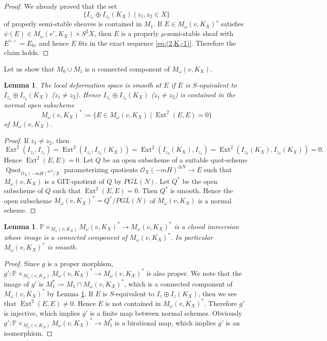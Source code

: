 \documentclass[leqno,11pt]{amsart}
\def\P{\ensuremath{\mathbb{P}}}
\def\Ext{\mathop{\mathrm{Ext}}\nolimits}
\def\Quot{\mathop{\mathrm{Quot}}\nolimits}
\newtheorem{Lem}[Thm]{Lemma}
\theoremstyle{definition}
\def\P{\ensuremath{\mathbb{P}}}
\def\OO{\ensuremath{\mathcal O}}
\begin{document}
\begin{proof}
We already proved that the set  
$$
\{I_{z_1} \oplus I_{z_2}(K_X) \mid z_1,z_2 \in X\}
$$
of properly semi-stable
sheaves is contained in $M_1$.
If $E \in M_\omega(v,K_X)^s$ satisfies
$\psi(E) \in M_\omega(v',K_X) \times S^2 X$, then
$E$ is a properly $\mu$-semi-stable sheaf with 
$E^{\vee \vee}=E_0$, and hence $E$ fits in the exact sequence
\eqref{eq:(2,K,-1)}.
Therefore the claim holds.
\end{proof}


Let us show that $M_0 \cup M_1$ is a connected component of
$M_\omega(v,K_X)$.

 
\begin{Lem}\label{lem:normal}
The local deformation space is smooth at $E$ if
$E$ is $S$-equivalent to $I_{z_1} \oplus I_{z_2} (K_X)$ ($z_1 \ne z_2$).
Hence $I_{z_1} \oplus I_{z_2} (K_X)$ ($z_1 \ne z_2$)
is contained in the normal open subscheme
$$
M_\omega(v,K_X)^*:=\{ E \in M_\omega(v,K_X) \mid \Ext^2(E,E)=0\}
$$
of $M_\omega(v,K_X)$.
\end{Lem}

\begin{proof}
If $z_1 \ne z_2$, then
$$
\Ext^2(I_{z_1},I_{z_1})=\Ext^2(I_{z_1}, I_{z_2} (K_X))=
\Ext^2(I_{z_2}(K_X),I_{z_1})=\Ext^2(I_{z_2}(K_X),I_{z_2}(K_X))=0.
$$
Hence $\Ext^2(E,E)=0$.
Let $Q$ be an open subscheme of a suitable quot-scheme
$\Quot_{\OO_X(-mH)^{\oplus N}/X}$
parameterizing quotients
$\OO_X(-mH)^{\oplus N} \to E$
such that $M_\omega(v,K_X)$ is a GIT-quotient of
$Q$ by $PGL(N)$.
Let $Q^*$ be the open subscheme of $Q$
such that $\Ext^2(E,E)=0$. Then $Q^*$ is smooth.
Hence the open subscheme $M_\omega(v,K_X)^*=Q^*/PGL(N)$ of
$M_\omega(v,K_X)$ is a normal scheme.  
\end{proof}

\begin{Lem}\label{lem:M^*} 
$\P \times_{M_\omega(v,K_X)} M_\omega(v,K_X)^* 
\to M_\omega(v,K_X)^*$ is a closed immersion whose
image is a connected component of $M_\omega(v,K_X)^*$.
In particular $M_\omega(v,K_X)^* $ is smooth.
\end{Lem}

\begin{proof}
Since $g$ is a proper morphism,
$g':\P \times_{M_\omega(v,K_X)} M_\omega(v,K_X)^*  \to M_\omega(v,K_X)^*$ is also proper.
We note that the image of $g'$ is $M_1^*:=M_1 \cap M_\omega(v,K_X)^*$,
which is a connected component of $M_\omega(v,K_X)^*$ by Lemma \ref{lem:normal}.
If $E$ is $S$-equivalent to $I_{z} \oplus I_z(K_X)$, then
we see that $\Ext^2(E,E) \ne 0$. Hence $E$ is not contained in 
$M_\omega(v,K_X)^*$.
Therefore $g'$ is injective, which implies
$g'$ is a finite map between normal schemes.
Obviously $g':\P \times_{M_\omega(v,K_X)} M_\omega(v,K_X)^*  \to M_1^*$ 
is a birational map, which implies $g'$ is an isomorphism.
\end{proof}
\end{document}
